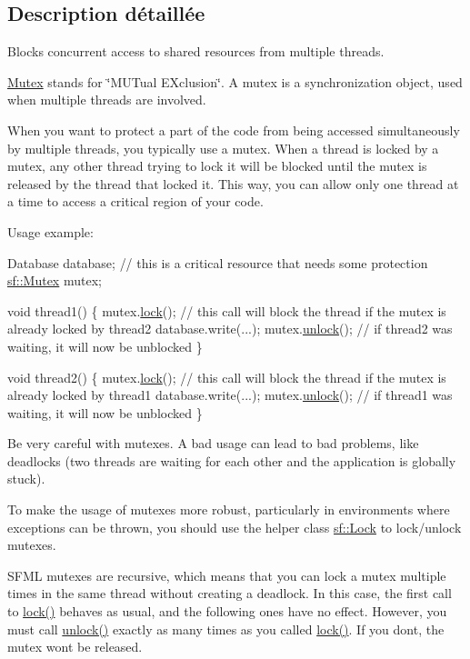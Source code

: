 \subsection{Description détaillée}
Blocks concurrent access to shared resources from multiple threads. 

\hyperlink{classsf_1_1Mutex}{Mutex} stands for \char`\"{}\+M\+U\+Tual E\+Xclusion\char`\"{}. A mutex is a synchronization object, used when multiple threads are involved.

When you want to protect a part of the code from being accessed simultaneously by multiple threads, you typically use a mutex. When a thread is locked by a mutex, any other thread trying to lock it will be blocked until the mutex is released by the thread that locked it. This way, you can allow only one thread at a time to access a critical region of your code.

Usage example\+: 
\begin{DoxyCode}
Database database; \textcolor{comment}{// this is a critical resource that needs some protection}
\hyperlink{classsf_1_1Mutex}{sf::Mutex} mutex;

\textcolor{keywordtype}{void} thread1()
\{
    mutex.\hyperlink{classsf_1_1Mutex_a1a16956a6bbea764480c1b80f2e45763}{lock}(); \textcolor{comment}{// this call will block the thread if the mutex is already locked by thread2}
    database.write(...);
    mutex.\hyperlink{classsf_1_1Mutex_ade71268ffc5e80756652058b01c23c33}{unlock}(); \textcolor{comment}{// if thread2 was waiting, it will now be unblocked}
\}

\textcolor{keywordtype}{void} thread2()
\{
    mutex.\hyperlink{classsf_1_1Mutex_a1a16956a6bbea764480c1b80f2e45763}{lock}(); \textcolor{comment}{// this call will block the thread if the mutex is already locked by thread1}
    database.write(...);
    mutex.\hyperlink{classsf_1_1Mutex_ade71268ffc5e80756652058b01c23c33}{unlock}(); \textcolor{comment}{// if thread1 was waiting, it will now be unblocked}
\}
\end{DoxyCode}


Be very careful with mutexes. A bad usage can lead to bad problems, like deadlocks (two threads are waiting for each other and the application is globally stuck).

To make the usage of mutexes more robust, particularly in environments where exceptions can be thrown, you should use the helper class \hyperlink{classsf_1_1Lock}{sf\+::\+Lock} to lock/unlock mutexes.

S\+F\+ML mutexes are recursive, which means that you can lock a mutex multiple times in the same thread without creating a deadlock. In this case, the first call to \hyperlink{classsf_1_1Mutex_a1a16956a6bbea764480c1b80f2e45763}{lock()} behaves as usual, and the following ones have no effect. However, you must call \hyperlink{classsf_1_1Mutex_ade71268ffc5e80756652058b01c23c33}{unlock()} exactly as many times as you called \hyperlink{classsf_1_1Mutex_a1a16956a6bbea764480c1b80f2e45763}{lock()}. If you don\textquotesingle{}t, the mutex won\textquotesingle{}t be released.

